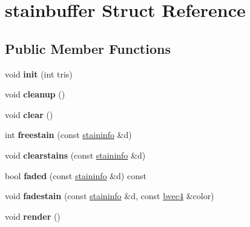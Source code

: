 \hypertarget{structstainbuffer}{}\section{stainbuffer Struct Reference}
\label{structstainbuffer}
\subsection*{Public Member Functions}
\begin{DoxyCompactItemize}
\item 
\mbox{\label{structstainbuffer_a5f33c87f6e37b370e3899efbfca63525}} 
void {\bfseries init} (int tris)
\item 
\mbox{\label{structstainbuffer_a42a4280dd6e0f048e6dfe40b419fa6e2}} 
void {\bfseries cleanup} ()
\item 
\mbox{\label{structstainbuffer_a3560d3a4b88207bb305f340f207ccc14}} 
void {\bfseries clear} ()
\item 
\mbox{\label{structstainbuffer_a831e03058cdd6f767e651a9cd5eb4661}} 
int {\bfseries freestain} (const \hyperlink{structstaininfo}{staininfo} \&d)
\item 
\mbox{\label{structstainbuffer_a80079447d0a8d7047245d586598795b8}} 
void {\bfseries clearstains} (const \hyperlink{structstaininfo}{staininfo} \&d)
\item 
\mbox{\label{structstainbuffer_a99be15d6942c6bc63fa29821f7dd1518}} 
bool {\bfseries faded} (const \hyperlink{structstaininfo}{staininfo} \&d) const
\item 
\mbox{\label{structstainbuffer_a08eb6acd55a580581719ced6c3dc5329}} 
void {\bfseries fadestain} (const \hyperlink{structstaininfo}{staininfo} \&d, const \hyperlink{structbvec4}{bvec4} \&color)
\item 
\mbox{\label{structstainbuffer_a96411389732bf3ae62a716ba7c10feef}} 
void {\bfseries render} ()
\item 
\mbox{\label{structstainbuffer_a3dfeeae7c98cc896cebc7f8c13d4ce3c}} 

\end{DoxyCompactItemize}
